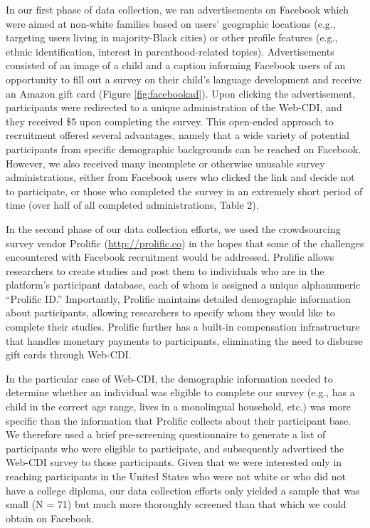 \documentclass[
  english,
  ,man,floatsintext]{apa6}
\begin{document}
In our first phase of data collection, we ran advertisements on Facebook which were aimed at non-white families based on users' geographic locations (e.g., targeting users living in majority-Black cities) or other profile features (e.g., ethnic identification, interest in parenthood-related topics). Advertisements consisted of an image of a child and a caption informing Facebook users of an opportunity to fill out a survey on their child's language development and receive an Amazon gift card (Figure \ref{fig:facebookad}). Upon clicking the advertisement, participants were redirected to a unique administration of the Web-CDI, and they received \$5 upon completing the survey. This open-ended approach to recruitment offered several advantages, namely that a wide variety of potential participants from specific demographic backgrounds can be reached on Facebook. However, we also received many incomplete or otherwise unusable survey administrations, either from Facebook users who clicked the link and decide not to participate, or those who completed the survey in an extremely short period of time (over half of all completed administrations, Table 2).

In the second phase of our data collection efforts, we used the crowdsourcing survey vendor Prolific (\url{http://prolific.co}) in the hopes that some of the challenges encountered with Facebook recruitment would be addressed. Prolific allows researchers to create studies and post them to individuals who are in the platform's participant database, each of whom is assigned a unique alphanumeric \enquote{Prolific ID.} Importantly, Prolific maintains detailed demographic information about participants, allowing researchers to specify whom they would like to complete their studies. Prolific further has a built-in compensation infrastructure that handles monetary payments to participants, eliminating the need to disburse gift cards through Web-CDI.

In the particular case of Web-CDI, the demographic information needed to determine whether an individual was eligible to complete our survey (e.g., has a child in the correct age range, lives in a monolingual household, etc.) was more specific than the information that Prolific collects about their participant base. We therefore used a brief pre-screening questionnaire to generate a list of participants who were eligible to participate, and subsequently advertised the Web-CDI survey to those participants. Given that we were interested only in reaching participants in the United States who were not white or who did not have a college diploma, our data collection efforts only yielded a sample that was small (N = 71) but much more thoroughly screened than that which we could obtain on Facebook.
\end{document}
